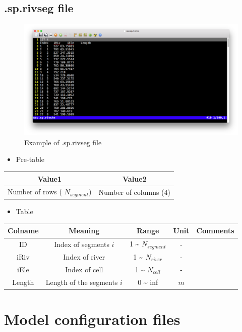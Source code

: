 \documentclass[
]{scrbook}
\providecommand{\tightlist}{%
  \setlength{\itemsep}{0pt}\setlength{\parskip}{0pt}}
\begin{document}
\hypertarget{sp.rivseg-file}{%
\subsection{.sp.rivseg file}\label{sp.rivseg-file}}

\begin{figure}
\centering
\includegraphics{Fig/IO/sp.rivchn.png}
\caption{Example of .sp.rivseg file}
\end{figure}

\begin{itemize}
\tightlist
\item
  Pre-table
\end{itemize}

\begin{longtable}[]{@{}cc@{}}
\toprule
Value1 & Value2\tabularnewline
\midrule
\endhead
Number of rows ( \(N_{segment}\)) & Number of columns (\(4\))\tabularnewline
\bottomrule
\end{longtable}

\begin{itemize}
\tightlist
\item
  Table
\end{itemize}

\begin{longtable}[]{@{}ccccc@{}}
\toprule
Colname & Meaning & Range & Unit & Comments\tabularnewline
\midrule
\endhead
ID & Index of segments \(i\) & 1 \textasciitilde{} \(N_{segment}\) & - &\tabularnewline
iRiv & Index of river & 1 \textasciitilde{} \(N_{river}\) & - &\tabularnewline
iEle & Index of cell & 1 \textasciitilde{} \(N_{cell}\) & - &\tabularnewline
Length & Length of the segments \(i\) & 0 \textasciitilde{} inf & \(m\) &\tabularnewline
\bottomrule
\end{longtable}

\hypertarget{model-configuration-files}{%
\section{Model configuration files}\label{model-configuration-files}}
\end{document}
